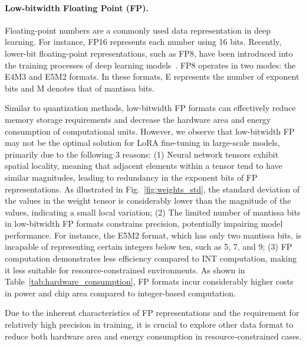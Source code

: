 \paragraph{Low-bitwidth Floating Point (FP).}
Floating-point numbers are a commonly used data representation in deep learning. For instance, FP16 represents each number using 16 bits. Recently, lower-bit floating-point representations, such as FP8, have been introduced into the training processes of deep learning models~\cite{micikevicius2022fp8,baalen2023fp8}. FP8 operates in two modes: the E4M3 and E5M2 formats. In these formats, E represents the number of exponent bits and M denotes that of mantissa bits.

Similar to quantization methods, low-bitwidth FP formats can effectively reduce memory storage requirements and decrease the hardware area and energy consumption of computational units. However, we observe that low-bitwidth FP may not be the optimal solution for LoRA fine-tuning in large-scale models, primarily due to the following 3 reasons: (1) Neural network tensors exhibit spatial locality, meaning that adjacent elements within a tensor tend to have similar magnitudes, leading to redundancy in the exponent bits of FP representations. As illustrated in Fig.~\ref{fig:weights_std}, the standard deviation of the values in the weight tensor is considerably lower than the magnitude of the values, indicating a small local variation; (2) The limited number of mantissa bits in low-bitwidth FP formats constrains precision, potentially impairing model performance. For instance, the E5M2 format, which has only two mantissa bits, is incapable of representing certain integers below ten, such as 5, 7, and 9; (3) FP computation demonstrates less efficiency compared to INT computation, making it less suitable for resource-constrained environments. As shown in Table~\ref{tab:hardware_consumption}, FP formats incur considerably higher costs in  power and chip area compared to integer-based computation.


Due to the inherent characteristics of FP representations and the requirement for relatively high precision in training, it is crucial to explore other data format to reduce both hardware area and energy consumption in resource-constrained cases.

